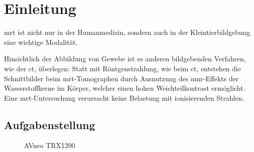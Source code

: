 \chapter{Einleitung}

\gls{mrt} ist nicht nur in der Humanmedizin, sondern auch in der Kleintierbildgebung eine wichtige Modalität.

 Hinsichtlich der Abbildung von Gewebe ist es anderen bildgebenden Verfahren, wie der \gls{ct}, überlegen: Statt mit Röntgenstrahlung, wie beim \gls{ct}, entstehen die Schnittbilder beim \gls{mrt}-Tomographen durch Ausnutzung des \gls{nmr}-Effekts der Wasserstoffkerne im Körper, welcher einen hohen Weichteilkontrast ermöglicht. Eine \gls{mrt}-Untersuchung verursacht keine Belastung mit ionisierenden Strahlen.
 
\section{Aufgabenstellung}

\begin{figure}[H]
	\centering
	\caption[TRX1200 Karte]{AVneo TRX1200}
	\label{fig:trx1200}
\end{figure}


